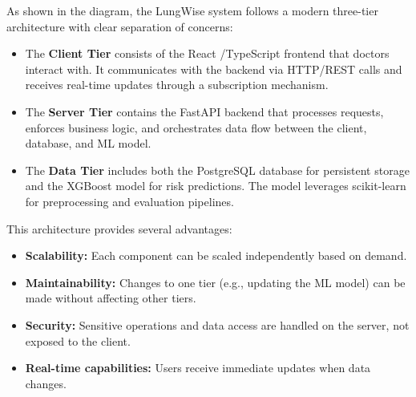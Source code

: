As shown in the diagram, the LungWise system follows a modern three-tier architecture with clear separation of concerns:

\begin{itemize}
    \item The \textbf{Client Tier} consists of the React \cite{react}/TypeScript \cite{typescript} frontend that doctors interact with. It communicates with the backend via HTTP/REST calls and receives real-time updates through a subscription mechanism.
    
    \item The \textbf{Server Tier} contains the FastAPI \cite{fastapi} backend that processes requests, enforces business logic, and orchestrates data flow between the client, database, and ML model.
    
    \item The \textbf{Data Tier} includes both the PostgreSQL \cite{postgresql} database for persistent storage and the XGBoost \cite{chen2016xgboost} model for risk predictions. The model leverages scikit-learn \cite{pedregosa2011scikit} for preprocessing and evaluation pipelines.
\end{itemize}

This architecture provides several advantages:
\begin{itemize}
    \item \textbf{Scalability:} Each component can be scaled independently based on demand.
    \item \textbf{Maintainability:} Changes to one tier (e.g., updating the ML model) can be made without affecting other tiers.
    \item \textbf{Security:} Sensitive operations and data access are handled on the server, not exposed to the client.
    \item \textbf{Real-time capabilities:} Users receive immediate updates when data changes.
\end{itemize}
